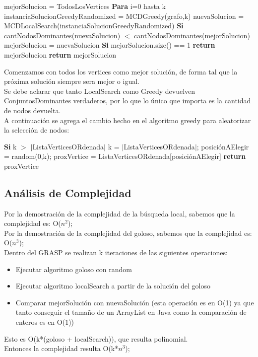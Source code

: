 \begin{codebox}
\li	mejorSolucion = TodosLosVertices
\li \textbf{Para} i=0 hasta k \Do
\li 	instanciaSolucionGreedyRandomized = MCDGreedy(grafo,k)
\li	nuevaSolucion = MCDLocalSearch(instanciaSolucionGreedyRandomized)
\li 	\textbf{Si} cantNodosDominantes(nuevaSolucion) $<$ cantNodosDominantes(mejorSolucion)  \Do
\li		mejorSolucion = nuevaSolucion
\li		\textbf{Si} mejorSolucion.size() == 1 \Do
\li			\textbf{return} mejorSolucion
		\End
	\End
    \End	
\li	\textbf{return} mejorSolucion	
\end{codebox}
Comenzamos con todos los vertices como mejor solución, de forma tal que la próxima solución siempre sera mejor o igual.\\
Se debe aclarar que tanto LocalSearch como Greedy devuelven ConjuntosDominantes verdaderos, por lo que lo único que importa es la cantidad de nodos devuelta.\\

A continuación se agrega el cambio hecho en el algoritmo greedy para aleatorizar la selección de nodos:\\
\begin{codebox}
\li     \textbf{Si} k $>$ $|$ListaVerticesORdenada$|$ \Do
\li 		k = $|$ListaVerticesORdenada$|$;
\End
\li 	posiciónAElegir = random(0,k);
\li	proxVertice = ListaVerticesORdenada[posiciónAElegir]
\li 	\textbf{return} proxVertice
\end{codebox}

\subsection{Análisis de Complejidad}
Por la demostración de la complejidad de la búsqueda local, sabemos que la complejidad es: O($n^2$);\\
Por la demostración de la complejidad del goloso, sabemos que la complejidad es: O($n^3$);\\
Dentro del GRASP se realizan k iteraciones de las siguientes operaciones:
\begin{itemize}
\item Ejecutar algoritmo goloso con random
\item Ejecutar algoritmo localSearch a partir de la solución del goloso
\item Comparar mejorSolución con nuevaSolución (esta operación es en O(1) ya que tanto conseguir el tamaño de un ArrayList en Java como la comparación de enteros es en O(1)) 
\end{itemize}
Esto es O(k*(goloso + localSearch)), que resulta polinomial.\\
Entonces la complejidad resulta O(k*$n^3$);


